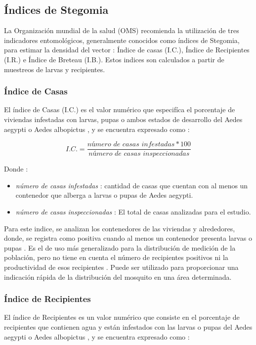 
\subsection{Índices de Stegomia}
\label{sec:densidad-vectorial-indices-stegomia}
La Organización mundial de la salud (OMS) recomienda la utilización de tres indicadores
entomológicos, generalmente conocidos como índices de Stegomia, para estimar la densidad del
vector : Índice de casas (I.C.), Índice de Recipientes (I.R.) e Índice de Breteau (I.B.). Estos
indices son calculados a partir de muestreos de larvas y recipientes.

\subsubsection{Índice de Casas}
El índice de Casas (I.C.) es el valor numérico que especifíca el porcentaje de viviendas
infestadas con larvas, pupas o ambos estados de desarrollo del Aedes aegypti o Aedes albopictus
\cite{ibanez1995vectores, world2009dengue}, y se encuentra expresado como :

\begin{equation}
I.C. = \frac{\textit{número de casas infestadas} * 100}{\textit{número de casas inspeccionadas}}
\end{equation}

Donde :
\begin{itemize}
\item \textit{número de casas infestadas} : cantidad de casas que cuentan con al menos un contenedor que alberga a larvas o pupas de Aedes aegypti.
\item \textit{número de casas inspeccionadas} : El total de casas analizadas para el estudio.
\end{itemize}

Para este indice, se analizan los contenedores de las viviendas y alrededores, donde, se registra
como positiva cuando al menos un contenedor presenta larvas o pupas \cite{ibanez1995vectores}. Es
el de uso más generalizado para la distribución de medición de la población, pero no tiene en
cuenta el número de recipientes positivos ni la productividad de esos recipientes
\cite{world2009dengue}. Puede ser utilizado para proporcionar una indicación rápida de la
distribución del mosquito en una área determinada.

\subsubsection{Índice de Recipientes}
El índice de Recipientes es un valor numérico que consiste en el porcentaje de recipientes que
contienen agua y están infestados con las larvas o pupas del Aedes aegypti o Aedes albopictus
\cite{ibanez1995vectores, world2009dengue}, y se encuentra expresado como :

